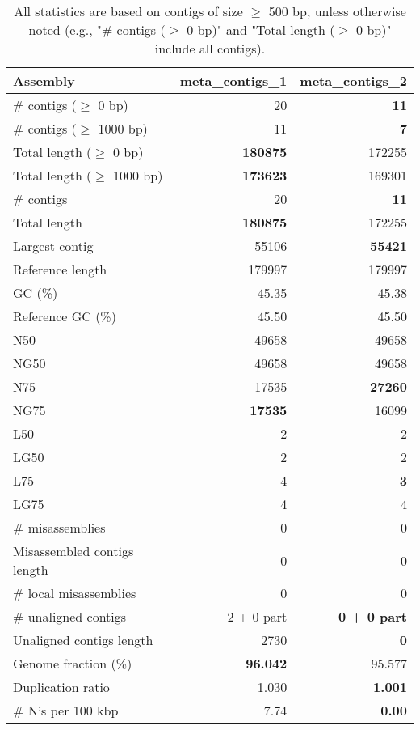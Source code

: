 \documentclass[12pt,a4paper]{article}
\begin{document}
\begin{table}[ht]
\begin{center}
\caption{All statistics are based on contigs of size $\geq$ 500 bp, unless otherwise noted (e.g., "\# contigs ($\geq$ 0 bp)" and "Total length ($\geq$ 0 bp)" include all contigs).}
\begin{tabular}{|l*{2}{|r}|}
\hline
Assembly & meta\_contigs\_1 & meta\_contigs\_2 \\ \hline
\# contigs ($\geq$ 0 bp) & 20 & {\bf 11} \\ \hline
\# contigs ($\geq$ 1000 bp) & 11 & {\bf 7} \\ \hline
Total length ($\geq$ 0 bp) & {\bf 180875} & 172255 \\ \hline
Total length ($\geq$ 1000 bp) & {\bf 173623} & 169301 \\ \hline
\# contigs & 20 & {\bf 11} \\ \hline
Total length & {\bf 180875} & 172255 \\ \hline
Largest contig & 55106 & {\bf 55421} \\ \hline
Reference length & 179997 & 179997 \\ \hline
GC (\%) & 45.35 & 45.38 \\ \hline
Reference GC (\%) & 45.50 & 45.50 \\ \hline
N50 & 49658 & 49658 \\ \hline
NG50 & 49658 & 49658 \\ \hline
N75 & 17535 & {\bf 27260} \\ \hline
NG75 & {\bf 17535} & 16099 \\ \hline
L50 & 2 & 2 \\ \hline
LG50 & 2 & 2 \\ \hline
L75 & 4 & {\bf 3} \\ \hline
LG75 & 4 & 4 \\ \hline
\# misassemblies & 0 & 0 \\ \hline
Misassembled contigs length & 0 & 0 \\ \hline
\# local misassemblies & 0 & 0 \\ \hline
\# unaligned contigs & 2 + 0 part & {\bf 0 + 0 part} \\ \hline
Unaligned contigs length & 2730 & {\bf 0} \\ \hline
Genome fraction (\%) & {\bf 96.042} & 95.577 \\ \hline
Duplication ratio & 1.030 & {\bf 1.001} \\ \hline
\# N's per 100 kbp & 7.74 & {\bf 0.00} \\ \hline

\end{tabular}
\end{center}
\end{table}
\end{document}
